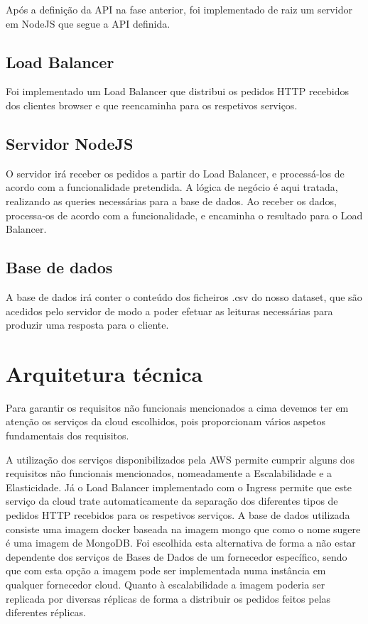 \documentclass[11pt,a4paper]{article}
\begin{document}
Após a definição da API na fase anterior, foi implementado de raiz um servidor em NodeJS que segue a API definida.


\subsection{Load Balancer}
Foi implementado um Load Balancer que distribui os pedidos HTTP recebidos dos clientes browser e que reencaminha para os respetivos serviços.


\subsection{Servidor NodeJS}
O servidor irá receber os pedidos a partir do Load Balancer, e processá-los de acordo com a funcionalidade pretendida. A lógica de negócio é aqui tratada, realizando as queries necessárias para a base de dados. Ao receber os dados, processa-os de acordo com a funcionalidade, e encaminha o resultado para o Load Balancer.

\subsection{Base de dados}
A base de dados irá conter o conteúdo dos ficheiros .csv do nosso dataset, que são acedidos pelo servidor de modo a poder efetuar as leituras necessárias para produzir uma resposta para o cliente. 

\section{Arquitetura técnica}

Para garantir os requisitos não funcionais mencionados a cima devemos ter em atenção os serviços da cloud escolhidos, pois proporcionam vários aspetos fundamentais dos requisitos.
\newline

A utilização dos serviços disponibilizados pela AWS permite cumprir alguns dos requisitos não funcionais mencionados, nomeadamente a Escalabilidade e a Elasticidade. Já o Load Balancer implementado com o Ingress permite que este serviço da cloud trate automaticamente da separação dos diferentes tipos de pedidos HTTP recebidos para os respetivos serviços. A base de dados utilizada consiste uma imagem docker baseada na imagem mongo que como o nome sugere é uma imagem de MongoDB. Foi escolhida esta alternativa de forma a não estar dependente dos serviços de Bases de Dados de um fornecedor específico, sendo que com esta opção a imagem pode ser implementada numa instância em qualquer fornecedor cloud. Quanto à escalabilidade a imagem poderia ser replicada por diversas réplicas de forma a distribuir os pedidos feitos pelas diferentes réplicas.  %
\newline
\end{document}
